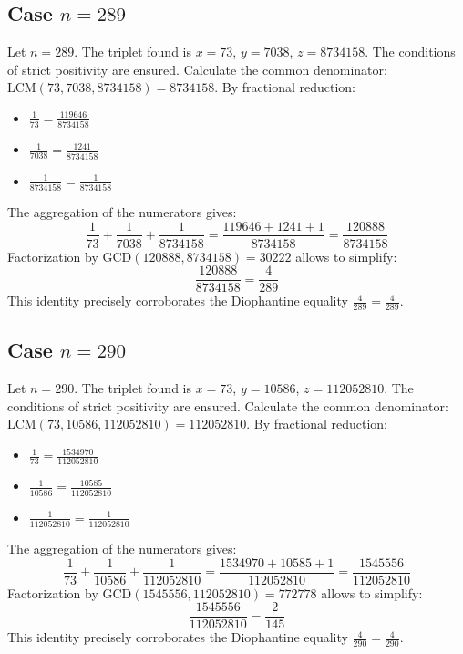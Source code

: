\documentclass[11pt,a4paper]{article}
\begin{document}
\subsection{Case $n = 289$}
Let $n = 289$. The triplet found is $x = 73$, $y = 7038$, $z = 8734158$.
The conditions of strict positivity are ensured.
Calculate the common denominator: $\text{LCM}(73, 7038, 8734158) = 8734158$.
By fractional reduction:
\begin{itemize}
    \item $\frac{1}{73} = \frac{119646}{8734158}$
    \item $\frac{1}{7038} = \frac{1241}{8734158}$
    \item $\frac{1}{8734158} = \frac{1}{8734158}$
\end{itemize}
The aggregation of the numerators gives:
$$ \frac{1}{73} + \frac{1}{7038} + \frac{1}{8734158} = \frac{119646 + 1241 + 1}{8734158} = \frac{120888}{8734158} $$
Factorization by $\text{GCD}(120888, 8734158) = 30222$ allows to simplify:
$$ \frac{120888}{8734158} = \frac{4}{289} $$
This identity precisely corroborates the Diophantine equality $\frac{4}{289} = \frac{4}{289}$.

\subsection{Case $n = 290$}
Let $n = 290$. The triplet found is $x = 73$, $y = 10586$, $z = 112052810$.
The conditions of strict positivity are ensured.
Calculate the common denominator: $\text{LCM}(73, 10586, 112052810) = 112052810$.
By fractional reduction:
\begin{itemize}
    \item $\frac{1}{73} = \frac{1534970}{112052810}$
    \item $\frac{1}{10586} = \frac{10585}{112052810}$
    \item $\frac{1}{112052810} = \frac{1}{112052810}$
\end{itemize}
The aggregation of the numerators gives:
$$ \frac{1}{73} + \frac{1}{10586} + \frac{1}{112052810} = \frac{1534970 + 10585 + 1}{112052810} = \frac{1545556}{112052810} $$
Factorization by $\text{GCD}(1545556, 112052810) = 772778$ allows to simplify:
$$ \frac{1545556}{112052810} = \frac{2}{145} $$
This identity precisely corroborates the Diophantine equality $\frac{4}{290} = \frac{4}{290}$.
\end{document}

